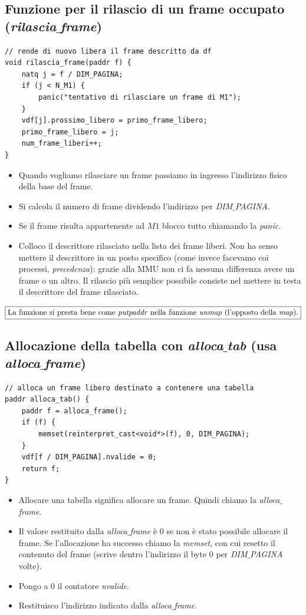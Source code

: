 \documentclass[11pt]{report}
\theoremstyle{definition}
\begin{document}
\subsection{Funzione per il rilascio di un frame occupato (\emph{rilascia$\_$frame})}
\small 
\begin{verbatim}
// rende di nuovo libera il frame descritto da df
void rilascia_frame(paddr f) {
    natq j = f / DIM_PAGINA;
    if (j < N_M1) {
        panic("tentativo di rilasciare un frame di M1");
    }
    vdf[j].prossimo_libero = primo_frame_libero;
    primo_frame_libero = j;
    num_frame_liberi++;
}
\end{verbatim}
\normalsize 
\begin{itemize}
	\item Quando vogliamo rilasciare un frame passiamo in ingresso l'indirizzo fisico della base del frame.
	\item Si calcola il numero di frame dividendo l'indirizzo per \emph{DIM$\_$PAGINA}. 
	\item Se il frame risulta appartenente ad $M1$ blocco tutto chiamando la \emph{panic}.
	\item Colloco il descrittore rilasciato nella lista dei frame liberi. Non ha senso mettere il descrittore in un posto specifico (come invece facevamo coi processi, \emph{precedenza}): grazie alla MMU non ci fa nessuna differenza avere un frame o un altro. Il rilascio più semplice possibile consiste nel mettere in testa il descrittore del frame rilasciato.
\end{itemize}
\[\boxed{\text{La funzione si presta bene come \emph{putpaddr} nella funzione \emph{unmap} (l'opposto della \emph{map}).}}\]
\subsection{Allocazione della tabella con \emph{alloca$\_$tab} (usa \emph{alloca$\_$frame})}
\small 
\begin{verbatim}
// alloca un frame libero destinato a contenere una tabella
paddr alloca_tab() {
    paddr f = alloca_frame();
    if (f) {
        memset(reinterpret_cast<void*>(f), 0, DIM_PAGINA);
    }
    vdf[f / DIM_PAGINA].nvalide = 0;
    return f;
}
\end{verbatim}
\normalsize 
\begin{itemize}
	\item Allocare una tabella significa allocare un frame. Quindi chiamo la \emph{alloca$\_$frame}.
	\item Il valore restituito dalla \emph{alloca$\_$frame} è $0$ se non è stato possibile allocare il frame. Se l'allocazione ha successo chiamo la \emph{memset}, con cui resetto il contenuto del frame (scrive dentro l'indirizzo il byte $0$ per \emph{DIM$\_$PAGINA} volte).
	\item Pongo a $0$ il contatore \emph{nvalide}.
	\item Restituisco l'indirizzo indicato dalla \emph{alloca$\_$frame}.
\end{itemize} 
\end{document}
